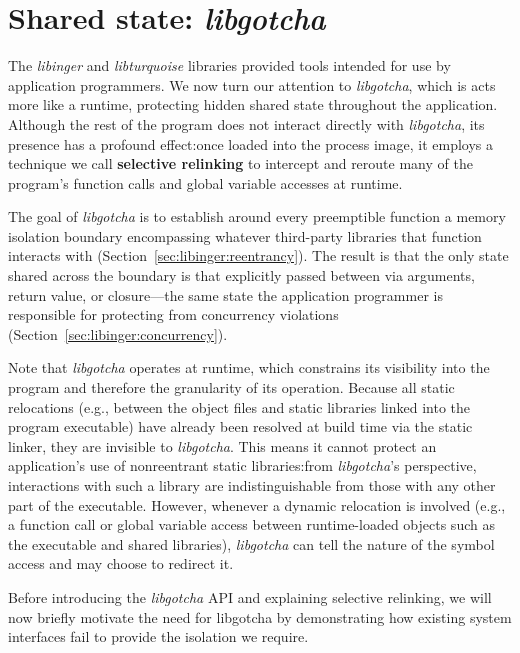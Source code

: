 \section{Shared state: \textit{libgotcha}}
\label{sec:libgotcha}

The \textit{libinger} and \textit{libturquoise} libraries provided
tools intended for use by application programmers.  We now turn our attention to
\textit{libgotcha}, which is acts more like a runtime, protecting hidden shared state
throughout the application.  Although the rest of the
program does not interact directly with \textit{libgotcha}, its presence has a
profound effect:\@ once loaded into the process image, it employs a technique we call
\textbf{selective relinking} to intercept and reroute many of the program's function
calls and global variable accesses at runtime.

The goal of \textit{libgotcha} is to establish around every preemptible function a
memory isolation boundary encompassing whatever third-party libraries that function
interacts with (Section~\ref{sec:libinger:reentrancy}).  The result is that the only
state shared across the boundary is that explicitly passed between via arguments,
return value, or closure---the same state the application programmer is responsible
for protecting from concurrency violations (Section~\ref{sec:libinger:concurrency}).

Note that \textit{libgotcha} operates at runtime, which constrains its visibility
into the program and therefore the granularity of its operation.  Because all static
relocations (e.g., between the object files and static libraries linked into the
program executable) have already been resolved at build time via the static linker,
they are invisible to \textit{libgotcha}.  This means it cannot protect an
application's use of nonreentrant static libraries:\@ from \textit{libgotcha}'s
perspective, interactions with such a library are indistinguishable from those with
any other part of the executable.  However, whenever a dynamic relocation is involved
(e.g., a function call or global variable access between runtime-loaded objects such
as the executable and shared libraries), \textit{libgotcha} can tell the nature of
the symbol access and may choose to redirect it.

Before introducing the \textit{libgotcha} API and explaining selective relinking, we
will now briefly motivate the need for libgotcha by demonstrating how existing system
interfaces fail to provide the isolation we require.


